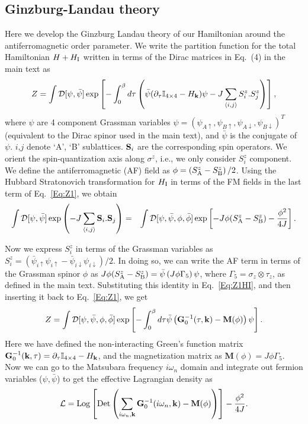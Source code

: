 \documentclass[aps,floatfix,prl]{revtex4}
\begin{document}
\subsection{Ginzburg-Landau theory}
Here we develop the Ginzburg Landau theory of our Hamiltonian around the antiferromagnetic order parameter.  We write the partition function for the total Hamiltonian $H+H_{\rm I}$ written in terms of the Dirac matrices in Eq.~(4) in the main text as
\begin{eqnarray}
Z=\int \mathcal{D}[\psi,\bar{\psi}]\exp\left[-\int_{0}^{\beta}d\tau\left(\bar{\psi}(\partial_\tau\mathbb{I}_{4\times 4}-H_{\bf k}) \psi - J\sum_{\langle{i,j}\rangle}S^z_i.S^z_j\right)\right],
\label{Eq:Z1}
\end{eqnarray}
where $\psi$ are 4 component Grassman variables $\psi=(\psi_{A\uparrow}, \psi_{B\uparrow},\psi_{A\downarrow},\psi_{B\downarrow})^T$ (equivalent to the Dirac spinor used in the main text), and $\bar{\psi}$ is the conjugate of $\psi$. $i$,$j$ denote `A', `B' sublattices. ${\bf S}_i$ are the corresponding spin operators. We orient the spin-quantization axis along $\sigma^z$, i.e., we only consider $S_i^z$ component. We define the antiferromagnetic (AF) field as $\phi = \left( S^z_{\rm A} - S^z_{\rm B}\right)/2$. Using the Hubbard Stratonovich transformation for $H_{\rm I}$ in terms of the FM fields in the last term of Eq.~\eqref{Eq:Z1}, we obtain
\begin{eqnarray}
\int \mathcal{D}[\psi,\bar{\psi}]\exp{\left(-J\sum_{\langle{i,j}\rangle}{\bf S}_i.{\bf S}_j\right)}&=&\int \mathcal{D}[\psi,\bar{\psi},\phi,\bar{\phi}]\exp\left[-J\phi(S^z_{{\rm A}}-S^z_{\rm B})-\frac{\phi^2}{4J}\right].
\label{Eq:Z1HI}
\end{eqnarray}

Now we express $S^z_i$ in terms of the Grassman variables as $S^z_i=(\bar{\psi}_{i\uparrow}\psi_{i\uparrow}-\bar{\psi}_{i\downarrow}\psi_{i\downarrow})/2$. In doing so, we can write the AF  term in terms of the Grassman spinor $\phi$ as $J\phi (S^z_{{\rm A}}-S^z_{\rm B}) = \bar{\psi}\left(J\phi\Gamma_5 \right)\psi$, where $\Gamma_5=\sigma_z\otimes\tau_z$, as defined in the main text. Substituting this identity in Eq.~\eqref{Eq:Z1HI}, and then inserting it back to Eq.~\eqref{Eq:Z1}, we get
\begin{eqnarray}
Z=\int \mathcal{D}[\psi,\bar{\psi},\phi,\bar{\phi}]\exp\left[-\int_{0}^{\beta}d\tau\bar{\psi}\left(\mathbf{G}_0^{-1}(\tau,{\bf k}) - \mathbf{M}(\phi)\right) \psi\right].
\label{Eq:Z2}
\end{eqnarray}
%
Here we have defined the non-interacting Green's function matrix $\mathbf{G}_0^{-1}({\bf k},\tau)=\partial_\tau\mathbb{I}_{4\times 4}-H_{\bf k}$, and the magnetization matrix as $\mathbf{M}(\phi)= J\phi\Gamma_5 $. Now we can go to the Matsubara frequency $i\omega_n$ domain and integrate out fermion variables ($\psi,\bar{\psi}$) to get the effective Lagrangian density as
\begin{eqnarray}
\mathcal{L}={\rm Log} \left[{\rm Det} \left(\sum_{{i\omega_n},{\bf k}} \mathbf{G}_0^{-1}(i\omega_n,{\bf k})-\mathbf{M}(\phi)\right)\right]-\frac{\phi^2 }{4J}.
\end{eqnarray}
\end{document}
